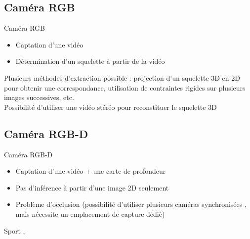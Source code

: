     \subsection{Caméra RGB}
    \begin{frame}{\subsecname}
        \begin{block}{Caméra RGB}
            \begin{itemize}[label=$\bullet$]
                \item Captation d'une vidéo
                \item Détermination d'un squelette à partir de la vidéo
            \end{itemize}
            Plusieurs méthodes d'extraction possible  : projection d'un squelette 3D en 2D pour obtenir une correspondance, utilisation de contraintes rigides sur plusieurs images successives, etc.\\
            Possibilité d'utiliser une vidéo stéréo pour reconstituer le squelette 3D 
        \end{block}
    \end{frame}
    
    \subsection{Caméra RGB-D}
    \begin{frame}{\subsecname}
        \begin{block}{Caméra RGB-D}
            \begin{itemize}[label=$\bullet$]
                \item Captation d'une vidéo + une carte de profondeur
                \item Pas d'inférence à partir d'une image 2D seulement
                \item Problème d'occlusion (possibilité d'utiliser plusieurs caméras synchronisées , mais nécessite un emplacement de capture dédié)
            \end{itemize}
            Sport , 
        \end{block}
    
    \end{frame}
    
